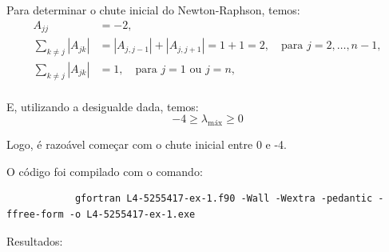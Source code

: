 \documentclass[12pt, a4paper]{article} %
\begin{document}
        Para determinar o chute inicial do Newton-Raphson, temos:
        \begin{align*}
            A_{jj} &= -2, \\
            \sum_{k \ne j} |A_{jk}| &= |A_{j, j-1}| + |A_{j, j+1}| = 1 + 1 = 2, \quad \text{para } j = 2, \ldots, n-1, \\
            \sum_{k \ne j} |A_{jk}| &= 1, \quad \text{para } j = 1 \text{ ou } j = n, \\
        \end{align*}

        E, utilizando a desigualde dada, temos:
        \begin{equation*}
            -4 \geq \lambda_{\text{máx}} \geq 0
        \end{equation*}

        Logo, \'e razoável começar com o chute inicial entre 0 e -4.

        O c\'odigo foi compilado com o comando:
        \begin{verbatim}
            gfortran L4-5255417-ex-1.f90 -Wall -Wextra -pedantic -ffree-form -o L4-5255417-ex-1.exe  
        \end{verbatim}

        Resultados:
\end{document}
